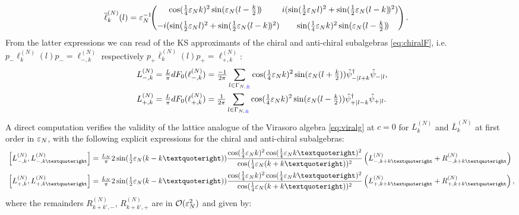 \documentclass[a4paper, 11pt]{article}
\DeclareMathOperator{\1}{\mathds{1}}
\begin{document}
\begin{align}
\label{eq:latviraDantichi}
\overline{\ell}^{(N)}_{k}(l) & = \vep_{N}^{-1}\!\!\begin{pmatrix}\hspace{-0.25cm} \cos(\tfrac{1}{4}\vep_{N}k)^{2}\sin(\vep_{N}(l-\tfrac{k}{2})\!) & \hspace{-0.25cm} i(\sin(\tfrac{1}{2}\vep_{N}l)^{2}+\sin(\tfrac{1}{2}\vep_{N}(l-k)\!)^{2}) \\[0.25cm] -i(\sin(\tfrac{1}{2}\vep_{N}l)^{2}+\sin(\tfrac{1}{2}\vep_{N}(l-k)\!)^{2}) & \sin(\tfrac{1}{4}\vep_{N}k)^{2}\sin(\vep_{N}(l-\tfrac{k}{2})\!) \end{pmatrix}.
\end{align}
From the latter expressions we can read of the KS approximants of the chiral and anti-chiral subalgebras \eqref{eq:chiralF}, i.e.~$p_{-}\ell^{(N)}_{k}(l)p_{-} = \ell^{(N)}_{-,k}$ respectively $p_{+}\overline{\ell}^{(N)}_{k}(l)p_{+} = \ell^{(N)}_{+,k}$:
\begin{align}
\label{eq:latvirasubchi}
L^{(N)}_{-,k} & = \tfrac{L}{\pi}dF_{0}(\ell^{(N)}_{-,k}) = \tfrac{-1}{2\pi}\sum_{l\in\Gamma_{N,{\color{blue}\pm}}}\cos(\tfrac{1}{4}\vep_{N}k)^{2}\sin(\vep_{N}(l+\tfrac{k}{2}))\hat{\psi}_{-|l+k}^{\dag}\hat{\psi}_{-|l}, \\ \nonumber
L^{(N)}_{+,k} & = \tfrac{L}{\pi}dF_{0}(\ell^{(N)}_{+,k}) = \tfrac{1}{2\pi}\sum_{l\in\Gamma_{N,{\color{blue}\pm}}}\cos(\tfrac{1}{4}\vep_{N}k)^{2}\sin(\vep_{N}(l-\tfrac{k}{2}))\hat{\psi}_{+|l-k}^{\dag}\hat{\psi}_{+|l}.
\end{align}
A direct computation verifies the validity of the lattice analogue of the Virasoro algebra \eqref{eq:viralg} at $c=0$ for $L^{(N)}_{k}$ and $\overline{L}^{(N)}_{k}$ at first order in $\varepsilon_{N}$, with the following explicit expressions for the chiral and anti-chiral subalgebras:
\begin{align}
\label{eq:latviraCRchi}
\left[L^{(N)}_{-,k},L^{(N)}_{-,k’}\right] & = \tfrac{L_{N}}{\pi}2\sin(\tfrac{1}{2}\vep_{N}(k-k’))\frac{\cos(\frac{1}{4}\vep_{N}k)^{2}\cos(\frac{1}{4}\vep_{N}k’)^{2}}{\cos(\frac{1}{4}\vep_{N}(k+k’))^{2}}\left(L^{(N)}_{-,k+k’} + R^{(N)}_{-,k+k’}\right) \\ \nonumber
\left[L^{(N)}_{+,k},L^{(N)}_{+,k’}\right] & = \tfrac{L_{N}}{\pi}2\sin(\tfrac{1}{2}\vep_{N}(k-k’))\frac{\cos(\frac{1}{4}\vep_{N}k)^{2}\cos(\frac{1}{4}\vep_{N}k’)^{2}}{\cos(\frac{1}{4}\vep_{N}(k+k’))^{2}}\left(L^{(N)}_{+,k+k’} + R^{(N)}_{+,k+k’}\right),
\end{align}
where the remainders $R^{(N)}_{k+k’,-}$, $R^{(N)}_{k+k’,+}$ are in $\mathcal{O}(\varepsilon_{N}^{2})$ and given by:
\end{document}

